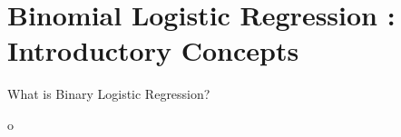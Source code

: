 \documentclass[SKLCluster.tex]{subfiles}
\begin{document}
\section{Binomial Logistic Regression :  Introductory Concepts}

What is Binary Logistic Regression?


o
\end{document}
